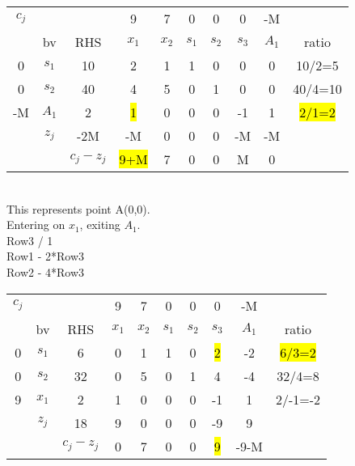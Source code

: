 \documentclass[answers]{exam}
\begin{document}
\begin{tabular}{cccccccccc}
	$c_j$                   &                            &                                & 9     & 7     & 0     & 0     & 0     & -M    &         \\
	\multicolumn{1}{c|}{}   & \multicolumn{1}{c|}{bv}    & \multicolumn{1}{c|}{RHS}       & $x_1$ & $x_2$ & $s_1$ & $s_2$ & $s_3$ & $A_1$ & ratio   \\ \cline{1-9}
	\multicolumn{1}{c|}{0}  & \multicolumn{1}{c|}{$s_1$} & \multicolumn{1}{c|}{10}        & 2     & 1     & 1     & 0     & 0     & 0     & 10/2=5  \\
	\multicolumn{1}{c|}{0}  & \multicolumn{1}{c|}{$s_2$} & \multicolumn{1}{c|}{40}        & 4     & 5     & 0     & 1     & 0     & 0     & 40/4=10 \\
	\multicolumn{1}{c|}{-M} & \multicolumn{1}{c|}{$A_1$} & \multicolumn{1}{c|}{2}         & \hl{1}     & 0     & 0     & 0     & -1    & 1     & \hl{2/1=2}   \\ \cline{1-9}
	& \multicolumn{1}{c|}{$z_j$} & \multicolumn{1}{c|}{-2M}       & -M    & 0     & 0     & 0     & -M    & -M    &         \\ \cline{3-9}
	&                            & \multicolumn{1}{c|}{$c_j-z_j$} & \hl{9+M}   & 7     & 0     & 0     & M     & 0     &        
\end{tabular} \\

\noindent
This represents point A(0,0). \\
Entering on $x_1$, exiting $A_1$. \\
Row3 / 1 \\
Row1 - 2*Row3 \\
Row2 - 4*Row3 \\


\begin{tabular}{cccccccccc}
	$c_j$                  &                            &                                & 9     & 7     & 0     & 0     & 0     & -M    &         \\
	\multicolumn{1}{c|}{}  & \multicolumn{1}{c|}{bv}    & \multicolumn{1}{c|}{RHS}       & $x_1$ & $x_2$ & $s_1$ & $s_2$ & $s_3$ & $A_1$ & ratio   \\ \cline{1-9}
	\multicolumn{1}{c|}{0} & \multicolumn{1}{c|}{$s_1$} & \multicolumn{1}{c|}{6}         & 0     & 1     & 1     & 0     & \hl{2}     & -2    & \hl{6/3=2}   \\
	\multicolumn{1}{c|}{0} & \multicolumn{1}{c|}{$s_2$} & \multicolumn{1}{c|}{32}        & 0     & 5     & 0     & 1     & 4     & -4    & 32/4=8  \\
	\multicolumn{1}{c|}{9} & \multicolumn{1}{c|}{$x_1$} & \multicolumn{1}{c|}{2}         & 1     & 0     & 0     & 0     & -1    & 1     & 2/-1=-2 \\ \cline{1-9}
	& \multicolumn{1}{c|}{$z_j$} & \multicolumn{1}{c|}{18}        & 9     & 0     & 0     & 0     & -9    & 9     &         \\ \cline{3-9}
	&                            & \multicolumn{1}{c|}{$c_j-z_j$} & 0     & 7     & 0     & 0     & \hl{9}     & -9-M  &        
\end{tabular} \\
\end{document}
